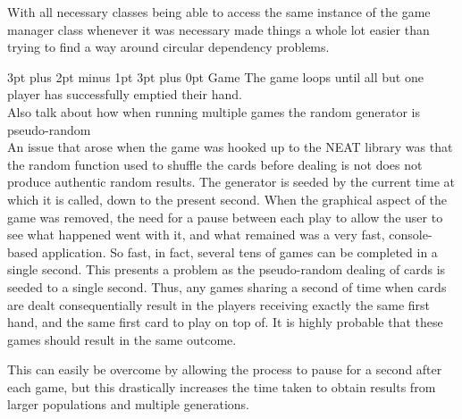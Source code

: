 \documentclass[12pt,a4paper]{article}
\makeatletter
\renewcommand\subsection{\@startsection {subsection}{1}{2mm} %
                               {3pt plus 2pt minus 1pt} %
                               {3pt plus 0pt} %
                               {\normalfont\bfseries}}
\makeatother
\begin{document}
With all necessary classes being able to access the same instance of the game manager class whenever it was necessary made things a whole lot easier than trying to find a way around circular dependency problems. 

\subsection{Game}
The game loops until all but one player has successfully emptied their hand. \\

Also talk about how when running multiple games the random generator is pseudo-random\\

An issue that arose when the game was hooked up to the NEAT library was that the random function used to shuffle the cards before dealing is not does not produce authentic random results. The generator is seeded by the current time at which it is called, down to the present second. When the graphical aspect of the game was removed, the need for a pause between each play to allow the user to see what happened went with it, and what remained was a very fast, console-based application. So fast, in fact, several tens of games can be completed in a single second. This presents a problem as the pseudo-random dealing of cards is seeded to a single second. Thus, any games sharing a second of time when cards are dealt consequentially result in the players receiving exactly the same first hand, and the same first card to play on top of. It is highly probable that these games should result in the same outcome. 

This can easily be overcome by allowing the process to pause for a second after each game, but this drastically increases the time taken to obtain results from larger populations and multiple generations. 
\end{document}
